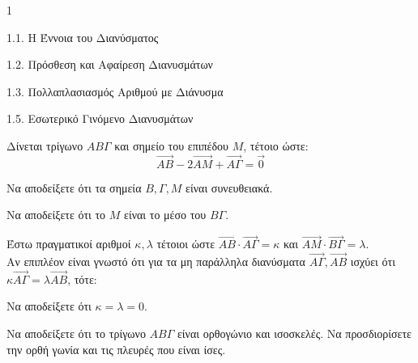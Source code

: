 \begin{ylh}{1}
    \item 1.1. Η Έννοια του Διανύσματος
    \item 1.2. Πρόσθεση και Αφαίρεση Διανυσμάτων
    \item 1.3. Πολλαπλασιασμός Αριθμού με Διάνυσμα
    \item 1.5. Εσωτερικό Γινόμενο Διανυσμάτων
\end{ylh}
Δίνεται τρίγωνο $ΑΒΓ$ και σημείο του επιπέδου $M$, τέτοιο ώστε:
\[ \vec{AB} - 2\vec{AM} + \vec{A\Gamma} = \vec{0} \]
\begin{alist}
\item Να αποδείξετε ότι τα σημεία $B, \Gamma, M$ είναι συνευθειακά. 
\item Να αποδείξετε ότι το $M$ είναι το μέσο του $B\Gamma$. 
\item Έστω πραγματικοί αριθμοί $\kappa, \lambda$ τέτοιοι ώστε $\vec{AB} \cdot \vec{A\Gamma} = \kappa$ και $\vec{AM} \cdot \vec{B\Gamma} = \lambda$. \\
Αν επιπλέον είναι γνωστό ότι για τα μη παράλληλα διανύσματα $\vec{A\Gamma}, \vec{AB}$ ισχύει ότι $\kappa \vec{A\Gamma} = \lambda \vec{AB}$, τότε:
    \begin{rlist}
    \item Να αποδείξετε ότι $\kappa = \lambda = 0$. 
    \item Να αποδείξετε ότι το τρίγωνο $AΒΓ$ είναι ορθογώνιο και ισοσκελές. Να προσδιορίσετε την ορθή γωνία και τις πλευρές που είναι ίσες. 
    \end{rlist}
\end{alist}